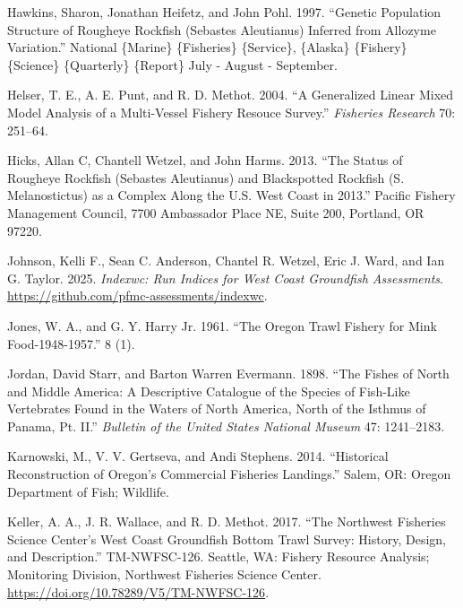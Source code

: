 \documentclass[
]{scrartcl}
\newlength{\cslhangindent}
\newenvironment{CSLReferences}[2] %
 {\begin{list}{}{%
  \setlength{\itemindent}{0pt}
  \setlength{\leftmargin}{0pt}
  \setlength{\parsep}{0pt}
  \ifodd #1
   \setlength{\leftmargin}{\cslhangindent}
   \setlength{\itemindent}{-1\cslhangindent}
  \fi
  \setlength{\itemsep}{#2\baselineskip}}}
 {\end{list}}
\begin{document}
\begin{CSLReferences}{1}{0}
Hawkins, Sharon, Jonathan Heifetz, and John Pohl. 1997. {``Genetic
Population Structure of Rougheye Rockfish ({Sebastes} Aleutianus)
Inferred from Allozyme Variation.''} National \{Marine\} \{Fisheries\}
\{Service\}, \{Alaska\} \{Fishery\} \{Science\} \{Quarterly\} \{Report\}
July - August - September.

Helser, T. E., A. E. Punt, and R. D. Methot. 2004. {``A Generalized
Linear Mixed Model Analysis of a Multi-Vessel Fishery Resouce Survey.''}
\emph{Fisheries Research} 70: 251--64.

Hicks, Allan C, Chantell Wetzel, and John Harms. 2013. {``The Status of
Rougheye Rockfish ({Sebastes} Aleutianus) and Blackspotted Rockfish
({S}. Melanostictus) as a Complex Along the {U}.{S}. {West} {Coast} in
2013.''} Pacific Fishery Management Council, 7700 Ambassador Place NE,
Suite 200, Portland, OR 97220.

Johnson, Kelli F., Sean C. Anderson, Chantel R. Wetzel, Eric J. Ward,
and Ian G. Taylor. 2025. \emph{Indexwc: Run Indices for West Coast
Groundfish Assessments}.
\url{https://github.com/pfmc-assessments/indexwc}.

Jones, W. A., and G. Y. Harry Jr. 1961. {``The {Oregon} {Trawl}
{Fishery} for {Mink} {Food}-1948-1957.''} 8 (1).

Jordan, David Starr, and Barton Warren Evermann. 1898. {``The Fishes of
{North} and {Middle} {America}: {A} Descriptive Catalogue of the Species
of Fish-Like Vertebrates Found in the Waters of {North} {America}, North
of the {Isthmus} of {Panama}, Pt. {II}.''} \emph{Bulletin of the United
States National Museum} 47: 1241--2183.

Karnowski, M., V. V. Gertseva, and Andi Stephens. 2014. {``Historical
{Reconstruction} of {Oregon}'s {Commercial} {Fisheries} {Landings}.''}
Salem, OR: Oregon Department of Fish; Wildlife.

Keller, A. A., J. R. Wallace, and R. D. Methot. 2017. {``The {N}orthwest
{F}isheries {S}cience {C}enter's West Coast Groundfish Bottom Trawl
Survey: History, Design, and Description.''} TM-NWFSC-126. Seattle, WA:
Fishery Resource Analysis; Monitoring Division, Northwest Fisheries
Science Center. \url{https://doi.org/10.78289/V5/TM-NWFSC-126}.


\end{CSLReferences}
\end{document}
